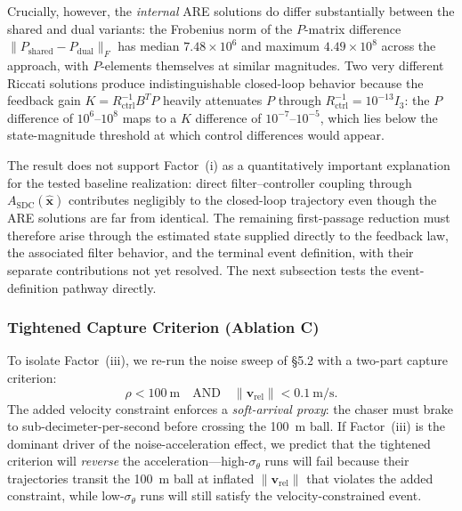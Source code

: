 \documentclass[preprint,3p,times]{elsarticle}
\begin{document}
Crucially, however, the \emph{internal} ARE solutions do differ substantially between the shared and dual variants: the Frobenius norm of the $P$-matrix difference $\|P_{\text{shared}} - P_{\text{dual}}\|_F$ has median $7.48 \times 10^6$ and maximum $4.49 \times 10^8$ across the approach, with $P$-elements themselves at similar magnitudes. Two very different Riccati solutions produce indistinguishable closed-loop behavior because the feedback gain $K = R_{\text{ctrl}}^{-1} B^T P$ heavily attenuates $P$ through $R_{\text{ctrl}}^{-1} = 10^{-13} I_3$: the $P$ difference of $10^6$--$10^8$ maps to a $K$ difference of $10^{-7}$--$10^{-5}$, which lies below the state-magnitude threshold at which control differences would appear.

The result does not support Factor~(i) as a quantitatively important explanation for the tested baseline realization: direct filter--controller coupling through $A_{\text{SDC}}(\hat{\mathbf{x}})$ contributes negligibly to the closed-loop trajectory even though the ARE solutions are far from identical. The remaining first-passage reduction must therefore arise through the estimated state supplied directly to the feedback law, the associated filter behavior, and the terminal event definition, with their separate contributions not yet resolved. The next subsection tests the event-definition pathway directly.

\subsubsection{Tightened Capture Criterion (Ablation C)}
\label{sec:abl_c}

To isolate Factor~(iii), we re-run the noise sweep of §5.2 with a two-part capture criterion:
\begin{equation}
\rho < 100~\text{m} \quad \text{AND} \quad \|\mathbf{v}_{\text{rel}}\| < 0.1~\text{m/s}. \label{eq:tight_capture}
\end{equation}
The added velocity constraint enforces a \emph{soft-arrival proxy}: the chaser must brake to sub-decimeter-per-second before crossing the 100~m ball. If Factor~(iii) is the dominant driver of the noise-acceleration effect, we predict that the tightened criterion will \emph{reverse} the acceleration---high-$\sigma_\theta$ runs will fail because their trajectories transit the 100~m ball at inflated $\|\mathbf{v}_{\text{rel}}\|$ that violates the added constraint, while low-$\sigma_\theta$ runs will still satisfy the velocity-constrained event.
\end{document}
